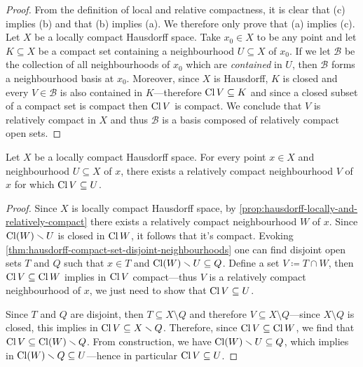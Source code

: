 \begin{proof}
    From the definition of local and relative compactness, it is clear that (c)
    implies (b) and that (b) implies (a). We therefore only prove that (a) implies
    (c). Let \(X\) be a locally compact Hausdorff space. Take \(x_0 \in X\) to be
    any point and let \(K \subseteq X\) be a compact set containing a neighbourhood
    \(U \subseteq X\) of \(x_0\). If we let \(\mathcal{B}\) be the collection of all
    neighbourhoods of \(x_0\) which are \emph{contained} in \(U\), then
    \(\mathcal{B}\) forms a neighbourhood basis at \(x_0\). Moreover, since \(X\) is
    Hausdorff, \(K\) is closed and every \(V \in \mathcal{B}\) is also contained in
    \(K\)---therefore \(\operatorname{Cl} V \subseteq K\) and since a closed subset of a compact
    set is compact then \(\operatorname{Cl} V\) is compact. We conclude that \(V\) is relatively
    compact in \(X\) and thus \(\mathcal{B}\) is a basis composed of relatively
    compact open sets.
\end{proof}


\begin{lemma}
    \label{lem:loc-cpct-haus-rel-cpct-nbhd}
    Let \(X\) be a locally compact Hausdorff space. For every point \(x \in X\) and
    neighbourhood \(U \subseteq X\) of \(x\), there exists a relatively compact
    neighbourhood \(V\) of \(x\) for which \(\operatorname{Cl} V \subseteq U\).
\end{lemma}

\begin{proof}
    Since \(X\) is locally compact Hausdorff space, by
    \cref{prop:hausdorff-locally-and-relatively-compact} there exists a relatively
    compact neighbourhood \(W\) of \(x\). Since \(\operatorname{Cl}(W) \smallsetminus U\) is closed in
    \(\operatorname{Cl} W\), it follows that it's compact. Evoking
    \cref{thm:hausdorff-compact-set-disjoint-neighbourhoods} one can find disjoint
    open sets \(T\) and \(Q\) such that \(x \in T\) and
    \(\operatorname{Cl}(W) \smallsetminus U \subseteq Q\). Define a set \(V \coloneq T \cap W\), then
    \(\operatorname{Cl} V \subseteq \operatorname{Cl} W\) implies in \(\operatorname{Cl} V\) compact---thus \(V\) is a
    relatively compact neighbourhood of \(x\), we just need to show that
    \(\operatorname{Cl} V \subseteq U\).

    Since \(T\) and \(Q\) are disjoint, then \(T \subseteq X \setminus Q\) and
    therefore \(V \subseteq X \setminus Q\)---since \(X \setminus Q\) is closed,
    this implies in \(\operatorname{Cl} V \subseteq X \smallsetminus Q\). Therefore, since
    \(\operatorname{Cl} V \subseteq \operatorname{Cl} W\), we find that \(\operatorname{Cl} V \subseteq \operatorname{Cl}(W) \smallsetminus
    Q\). From construction, we have \(\operatorname{Cl}(W) \smallsetminus U \subseteq Q\), which
    implies in \(\operatorname{Cl}(W) \smallsetminus Q \subseteq U\)---hence in particular
    \(\operatorname{Cl} V \subseteq U\).
\end{proof}

